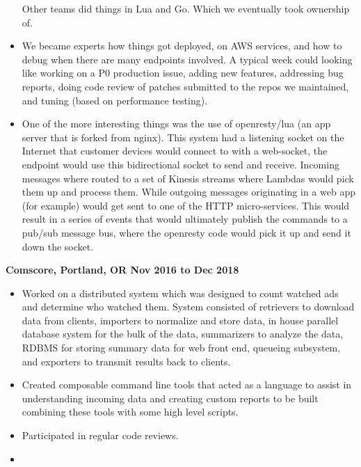 \documentclass{res}
\begin{document}
\begin{resume}
\begin{itemize}
Other teams did things in Lua and Go. Which we eventually took ownership
of.

  \item
We became experts how things got deployed, on AWS services, and how to
debug when there are many endpoints involved.  A typical week could
looking like working on a P0 production issue, adding new features,
addressing bug reports, doing code review of patches submitted to the
repos we maintained, and tuning (based on performance testing).

  \item
One of the more interesting things was the use of openresty/lua (an app server
that is forked from nginx).  This system had a listening socket on the
Internet that customer devices would connect to with a web-socket, the endpoint
would use this bidirectional socket to send and receive.  Incoming messages
where routed to a set of Kinesis streams where Lambdas would pick them up and
process them.  While outgoing messages originating in a web app (for
example) would get sent to one of  the HTTP micro-services.  This would result
in a series of events that would ultimately publish the commands to a pub/sub
message bus, where the openresty code would pick it up and send it down the socket.
  \end{itemize}

  {\large \bf Comscore, Portland, OR \hfill Nov 2016 to Dec 2018}
  \begin{itemize}

  \item
    Worked on a distributed system which was designed to count watched ads and
    determine who watched them.  System consisted of retrievers to download
    data from clients, importers to normalize and store data, in house
    parallel database system for the bulk of the data, summarizers to
    analyze the data, RDBMS for storing summary data for
    web front end, queueing subsystem, and exporters to transmit
    results back to clients.

  \item
    Created composable command line tools that acted as a language to
    assist in understanding incoming data and creating custom reports to
    be built combining these tools with some high level scripts.

  \item
    Participated in regular code reviews.

  \item


\end{itemize}
\end{resume}
\end{document}
